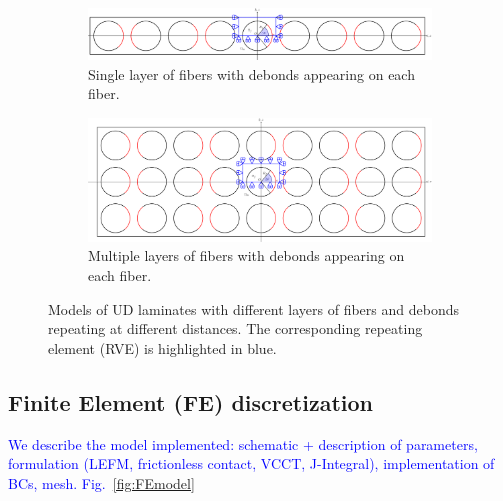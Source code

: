 \documentclass[review]{elsarticle}
\begin{document}
\begin{figure}[!h]
    \begin{subfigure}[b]{\textwidth}
        \includegraphics[width=\textwidth]{freeThinPlyAllDebonds.pdf}
        \caption{Single layer of fibers with debonds appearing on each fiber.}\label{subfig:freethinplyalldebonds}
    \end{subfigure} 

    \begin{subfigure}[b]{\textwidth}
        \includegraphics[width=\textwidth]{thickPlyAllDebonds.pdf}
        \caption{Multiple layers of fibers with debonds appearing on each fiber.}\label{subfig:thickplyalldebonds}
    \end{subfigure} 

\caption{Models of UD laminates with different layers of fibers and debonds repeating at different distances. The corresponding repeating element (RVE) is highlighted in blue.}\label{fig:laminateModels}
\end{figure}


\subsection{Finite Element (FE) discretization}

\textcolor{blue}{We describe the model implemented: schematic + description of parameters, formulation (LEFM, frictionless contact, VCCT, J-Integral), implementation of BCs, mesh. Fig.~\ref{fig:FEmodel}}
\end{document}
